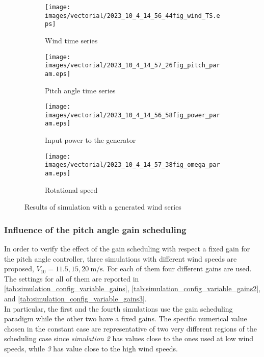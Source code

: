 \begin{figure}[htb]
  \begin{subfigure}{0.49\columnwidth}
    \centering
    \texttt{[image: images/vectorial/2023\_10\_4\_14\_56\_44fig\_wind\_TS.eps]}
    \caption{Wind time series}
    \label{fig:2023_05_1_00_55_48fig_wind_TS.eps}
  \end{subfigure}
  \begin{subfigure}{0.49\columnwidth}
    \centering
    \texttt{[image: images/vectorial/2023\_10\_4\_14\_57\_26fig\_pitch\_param.eps]}
    \caption{Pitch angle time series}
    \label{fig:2023_05_1_00_50_19fig_power_param}
  \end{subfigure}
  \begin{subfigure}{0.49\columnwidth}
    \centering
    \texttt{[image: images/vectorial/2023\_10\_4\_14\_56\_58fig\_power\_param.eps]}
    \caption{Input power to the generator}
    \label{fig:2023_05_1_00_51_17fig_omega_param}
  \end{subfigure}
  \begin{subfigure}{0.49\columnwidth}
    \centering
    \texttt{[image: images/vectorial/2023\_10\_4\_14\_57\_38fig\_omega\_param.eps]}
    \caption{Rotational speed}
    \label{fig:2023_05_1_00_50_58fig_pitch_param}
  \end{subfigure}
  \caption{Results of simulation with a generated wind series}
  \label{fig:simulation_rand_wind_NPC}
\end{figure}

\subsubsection{Influence of the pitch angle gain scheduling}\label{subsec:gain_scheduling_disabling}
In order to verify the effect of the gain scheduling with respect a fixed gain for the pitch angle controller, three simulations with different wind speeds are proposed, $V_{10} = 11.5, 15, 20 \ \si{\meter\per\second}$. For each of them four different gains are used. The settings for all of them are reported in \autoref{tab:simulation_config_variable_gains}, \autoref{tab:simulation_config_variable_gains2}, and \autoref{tab:simulation_config_variable_gains3}. \\
In particular, the first and the fourth simulations use the gain scheduling paradigm while the other two have a fixed gains. The specific numerical value chosen in the constant case are representative of two very different regions of the scheduling case since \textit{simulation 2} has values close to the ones used at low wind speeds, while \textit{3} has value close to the high wind speeds. 

